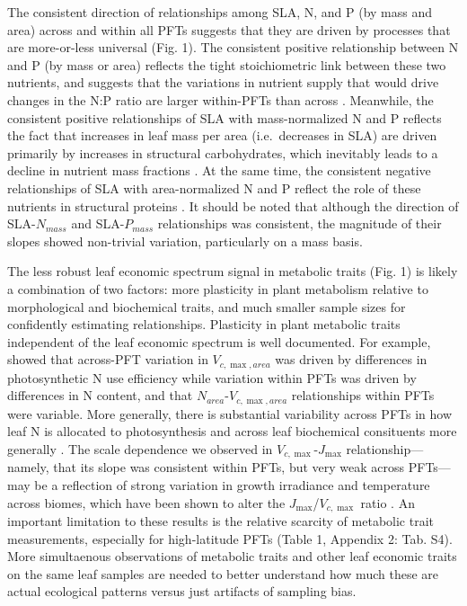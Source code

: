 \documentclass{article}
\begin{document}
The consistent direction of relationships among SLA, N, and P (by mass and area) across and within all PFTs suggests that they are driven by processes that are more-or-less universal (Fig. 1).
The consistent positive relationship between N and P (by mass or area) reflects the tight stoichiometric link between these two nutrients, and suggests that the variations in nutrient supply that would drive changes in the N:P ratio are larger within-PFTs than across \citep{elser_2010_biological}.
Meanwhile, the consistent positive relationships of SLA with mass-normalized N and P reflects the fact that increases in leaf mass per area (i.e.\ decreases in SLA) are driven primarily by increases in structural carbohydrates, which inevitably leads to a decline in nutrient mass fractions \citep{poorter_2009_causes}.
At the same time, the consistent negative relationships of SLA with area-normalized N and P reflect the role of these nutrients in structural proteins \citep{onoda_2017_physiological}.
It should be noted that although the direction of SLA-$N_{mass}$ and SLA-$P_{mass}$ relationships was consistent, the magnitude of their slopes showed non-trivial variation, particularly on a mass basis.

The less robust leaf economic spectrum signal in metabolic traits (Fig. 1) is likely a combination of two factors:
more plasticity in plant metabolism relative to morphological and biochemical traits,
and much smaller sample sizes for confidently estimating relationships.
Plasticity in plant metabolic traits independent of the leaf economic spectrum is well documented.
For example, \citealt{kattge_2009_quantifying} showed that across-PFT variation in $V_{c,\max,area}$ was driven by differences in photosynthetic N use efficiency while variation within PFTs was driven by differences in N content, and that $N_{area}$-$V_{c,\max,area}$ relationships within PFTs were variable.
More generally, there is substantial variability across PFTs in how leaf N is allocated to photosynthesis \citep{ghimire_2017_global} and across leaf biochemical consituents more generally \citep{onoda_2011_global}.
The scale dependence we observed in $V_{c,\max}$-$J_{\max}$ relationship---namely, that its slope was consistent within PFTs, but very weak across PFTs---may be a reflection of strong variation in growth irradiance and temperature across biomes, which have been shown to alter the $J_{\max}$/$V_{c,\max}$ ratio \citep{hikosaka_2005_nitrogen,hikosaka_2005_temperature,xiang_2013_contrasting}.
An important limitation to these results is the relative scarcity of metabolic trait measurements, especially for high-latitude PFTs (Table 1, Appendix 2: Tab. S4).
More simultaenous observations of metabolic traits and other leaf economic traits on the same leaf samples are needed to better understand how much these are actual ecological patterns versus just artifacts of sampling bias.
\end{document}
